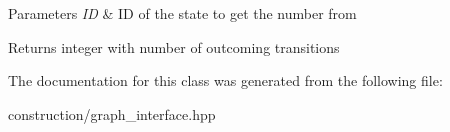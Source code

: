 \begin{DoxyParams}{\-Parameters}
{\em \-I\-D} & \-I\-D of the state to get the number from\\
\hline
\end{DoxyParams}
\begin{DoxyReturn}{\-Returns}
integer with number of outcoming transitions 
\end{DoxyReturn}


\-The documentation for this class was generated from the following file\-:\begin{DoxyCompactItemize}
\item 
construction/graph\-\_\-interface.\-hpp\end{DoxyCompactItemize}
